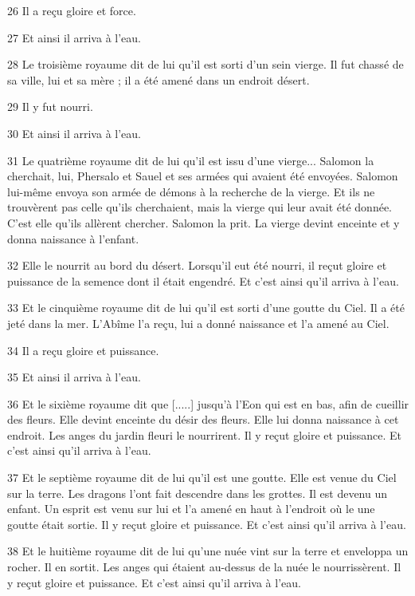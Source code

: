 \par 26 Il a reçu gloire et force.
\par 27 Et ainsi il arriva à l'eau.
\par 28 Le troisième royaume dit de lui qu'il est sorti d'un sein vierge. Il fut chassé de sa ville, lui et sa mère ; il a été amené dans un endroit désert.

\par 29 Il y fut nourri.
\par 30 Et ainsi il arriva à l'eau.
\par 31 Le quatrième royaume dit de lui qu'il est issu d'une vierge... Salomon la cherchait, lui, Phersalo et Sauel et ses armées qui avaient été envoyées. Salomon lui-même envoya son armée de démons à la recherche de la vierge. Et ils ne trouvèrent pas celle qu'ils cherchaient, mais la vierge qui leur avait été donnée. C'est elle qu'ils allèrent chercher. Salomon la prit. La vierge devint enceinte et y donna naissance à l'enfant.

\par 32 Elle le nourrit au bord du désert. Lorsqu'il eut été nourri, il reçut gloire et puissance de la semence dont il était engendré. Et c'est ainsi qu'il arriva à l'eau.

\par 33 Et le cinquième royaume dit de lui qu'il est sorti d'une goutte du Ciel. Il a été jeté dans la mer. L'Abîme l'a reçu, lui a donné naissance et l'a amené au Ciel.
\par 34 Il a reçu gloire et puissance.
\par 35 Et ainsi il arriva à l'eau.
\par 36 Et le sixième royaume dit que [.....] jusqu'à l'Eon qui est en bas, afin de cueillir des fleurs. Elle devint enceinte du désir des fleurs. Elle lui donna naissance à cet endroit. Les anges du jardin fleuri le nourrirent. Il y reçut gloire et puissance. Et c'est ainsi qu'il arriva à l'eau.

\par 37 Et le septième royaume dit de lui qu'il est une goutte. Elle est venue du Ciel sur la terre. Les dragons l'ont fait descendre dans les grottes. Il est devenu un enfant. Un esprit est venu sur lui et l'a amené en haut à l'endroit où le une goutte était sortie. Il y reçut gloire et puissance. Et c'est ainsi qu'il arriva à l'eau.

\par 38 Et le huitième royaume dit de lui qu'une nuée vint sur la terre et enveloppa un rocher. Il en sortit. Les anges qui étaient au-dessus de la nuée le nourrissèrent. Il y reçut gloire et puissance. Et c'est ainsi qu'il arriva à l'eau.

